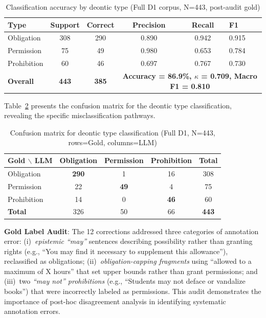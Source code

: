 \begin{table}[h]
\centering
\caption{Classification accuracy by deontic type (Full D1 corpus, N=443, post-audit gold)}
\label{tab:deontic-type-breakdown}
\begin{tabular}{lccccl}
\toprule
\textbf{Type} & \textbf{Support} & \textbf{Correct} & \textbf{Precision} & \textbf{Recall} & \textbf{F1} \\
\midrule
Obligation   & 308 & 290 & 0.890 & 0.942 & 0.915 \\
Permission   & 75  & 49  & 0.980 & 0.653 & 0.784 \\
Prohibition  & 60  & 46  & 0.697 & 0.767 & 0.730 \\
\midrule
\textbf{Overall} & \textbf{443} & \textbf{385} & \multicolumn{3}{c}{\textbf{Accuracy = 86.9\%, $\kappa$ = 0.709, Macro F1 = 0.810}} \\
\bottomrule
\end{tabular}
\end{table}

Table~\ref{tab:type-confusion-matrix} presents the confusion matrix for the deontic type classification, revealing the specific misclassification pathways.

\begin{table}[h]
\centering
\caption{Confusion matrix for deontic type classification (Full D1, N=443, rows=Gold, columns=LLM)}
\label{tab:type-confusion-matrix}
\begin{tabular}{l|ccc|c}
\toprule
\textbf{Gold $\backslash$ LLM} & \textbf{Obligation} & \textbf{Permission} & \textbf{Prohibition} & \textbf{Total} \\
\midrule
Obligation   & \textbf{290} & 1  & 16 & 308 \\
Permission   & 22  & \textbf{49} & 4  & 75 \\
Prohibition  & 14  & 0  & \textbf{46} & 60 \\
\midrule
\textbf{Total} & 326 & 50 & 66 & \textbf{443} \\
\bottomrule
\end{tabular}
\end{table}

\textbf{Gold Label Audit}: The 12 corrections addressed three categories of annotation error: (i)~\textit{epistemic ``may''} sentences describing possibility rather than granting rights (e.g., ``You may find it necessary to supplement this allowance''), reclassified as obligations; (ii)~\textit{obligation-capping fragments} using ``allowed to a maximum of X hours'' that set upper bounds rather than grant permissions; and (iii)~two \textit{``may not'' prohibitions} (e.g., ``Students may not deface or vandalize books'') that were incorrectly labeled as permissions. This audit demonstrates the importance of post-hoc disagreement analysis in identifying systematic annotation errors.

